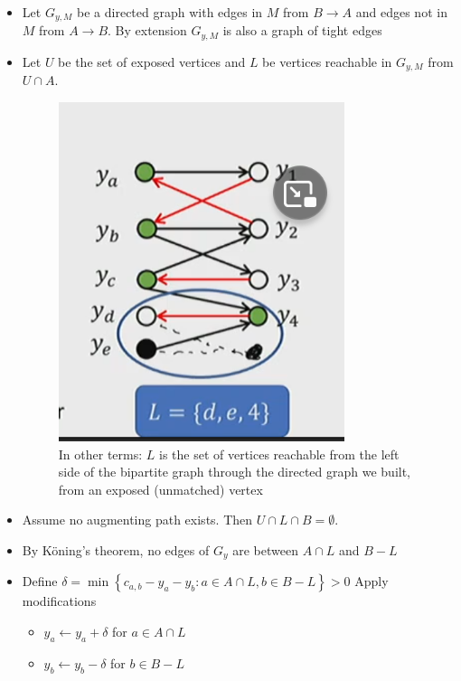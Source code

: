 \documentclass[../notes.tex]{subfiles}
\begin{document}
\begin{itemize}
    \item Let $ G_{y, M} $ be a directed graph with edges in $ M $ from $ B \to A $ and edges not in $ M $ from $ A \to B $. By extension $ G_{y, M} $ is also a graph of tight edges
    \item Let $ U $ be the set of exposed vertices and $ L $ be vertices reachable in $ G_{y, M} $ from $ U \cap A$. 
        \begin{figure}[H]
            \centering
            \includegraphics[width=0.8\linewidth]{img/image_2023-04-06-04-28-29.png}
            \caption{In other terms: $ L $ is the set of vertices reachable from the left side of the bipartite graph through the directed graph we built, from an exposed (unmatched) vertex}
        \end{figure}

    \item Assume no augmenting path exists. Then $ U \cap L \cap B  = \emptyset $. 
    \item By K\"oning's theorem, no edges of $ G_y $ are between $ A \cap L $ and $  B - L $
    \item Define $ \delta = \min \left\{ c_{a,b} - y_a - y_b: a \in A \cap L, b \in B - L \right\} > 0  $
        Apply modifications

        \begin{itemize}
            \item $ y_a \leftarrow y_a + \delta $ for $ a \in A \cap L $
            \item $ y_b \leftarrow y_b - \delta $ for $ b \in B - L $
        \end{itemize}
\end{itemize}
\end{document}
